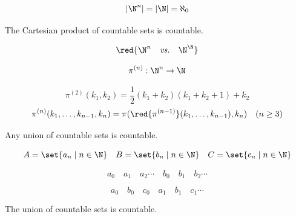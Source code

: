 \begin{frame}{}
  \begin{theorem}[$\N^{n}$ is Countable.]
    \[
      |\N^{n}| = |\N| = \aleph_{0}
    \]
  \end{theorem}

  \pause
  \begin{theorem}
    The Cartesian product of  countable sets is countable.
  \end{theorem}

  \pause
  \[
    \red{\N^{n} \quad \text{\it vs.} \quad \N^{\N}}
  \]

  \pause
  \[
    \pi^{(n)}:\N^n \to \N
  \]

  \pause
  \[
    \pi^{(2)}(k_1, k_2) = \frac{1}{2} (k_1 + k_2)(k_1 + k_2 + 1) + k_2
  \]
  \pause
  \[
    \pi^{(n)}(k_1, \ldots, k_{n-1}, k_n) = \pi (\red{\pi^{(n-1)}}(k_1, \ldots, k_{n-1}) , k_n)
    \quad (n \ge 3)
  \]
\end{frame}

\begin{frame}{}
  \begin{theorem}
    Any  union of countable sets is countable.
  \end{theorem}

  \pause
  \[
    A = \set{a_n \mid n \in \N} \quad B = \set{b_n \mid n \in \N} \quad C = \set{c_n \mid n \in \N}
  \]

  \pause
  \[
    a_0 \quad a_1 \quad a_2 \cdots \quad b_0 \quad b_1 \quad b_2 \cdots
  \]

  \pause

  \pause
  \[
    a_0 \quad b_0 \quad c_0 \quad a_1 \quad b_1 \quad c_1 \cdots
  \]
\end{frame}

\begin{frame}{}
  \begin{theorem}
    The union of  countable sets is countable.
  \end{theorem}

  \pause
  \begin{center}
  \end{center}
\end{frame}

